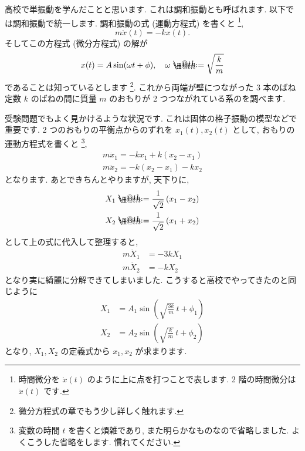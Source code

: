 \documentclass[openany, a4paper, oneside]{jsbook}
\makeatletter
\newcommand*{\defeq}{\mathrel{\rlap{%
\raisebox{0.3ex}{$\m@th\cdot$}}%
\raisebox{-0.3ex}{$\m@th\cdot$}}%
=}
\theoremstyle{break}
\theoremstyle{breakdefn}
\makeatother
\begin{document}
高校で単振動を学んだことと思います.
これは調和振動とも呼ばれます.
以下では調和振動で統一します.
調和振動の式 (運動方程式) を書くと \footnote{時間微分を  $\dot{x}(t)$ のように上に点を打つことで表します.
2 階の時間微分は  $\ddot{x}(t)$ です.
 },
\begin{equation}
m\ddot{x}(t) = -kx (t).
\end{equation}
そしてこの方程式 (微分方程式) の解が
\begin{equation}
x (t) = A \sin (\omega t + \phi ), \quad \omega \defeq \sqrt{ \frac{k}{m} }
\end{equation}
であることは知っているとします \footnote{微分方程式の章でもう少し詳しく触れます.
 }.
これから両端が壁につながった 3 本のばね定数 $k$ のばねの間に質量 $m$ のおもりが 2 つつながれている系のを調べます.

受験問題でもよく見かけるような状況です. これは固体の格子振動の模型などで重要です.
2 つのおもりの平衡点からのずれを $x_{1}(t),x_{2}(t)$ として, おもりの運動方程式を書くと \footnote{変数の時間 $t$ を書くと煩雑であり, また明らかなものなので省略しました.
よくこうした省略をします.
慣れてください.
 },
\begin{align}
m\ddot{x}_{1} = -kx_{1} + k (x_{2} - x_{1}) \\
m\ddot{x}_{2} = - k (x_{2} - x_{1}) - kx_{2}
\end{align}
となります. あとできちんとやりますが, 天下りに,
\begin{align}
X_{1} \defeq \frac{1}{\sqrt{2}}\left ( x_{1} - x_{2} \right) \\
X_{2} \defeq \frac{1}{\sqrt{2}}\left ( x_{1} + x_{2} \right)
\end{align}
として上の式に代入して整理すると,
    \begin{align}
        m\ddot{X}_{1} &= - 3kX_{1} \\
        m\ddot{X}_{2} &= -kX_{2}
    \end{align}
となり実に綺麗に分解できてしまいました.
こうすると高校でやってきたのと同じように
    \begin{align}
        X_1 &= A_1 \sin \left ( \sqrt{\frac{ 3k }{m}} \, t + \phi _1 \right) \\
        X_2 &= A_2 \sin \left ( \sqrt{\frac{ k }{m}} \, t + \phi _2 \right)
    \end{align}
となり,  $X_1, X_2$ の定義式から $x_1,x_2$ が求まります.
\end{document}

